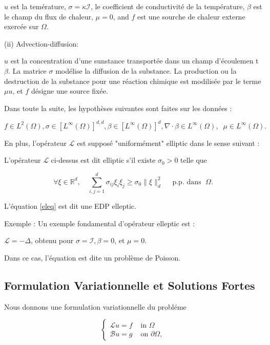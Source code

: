 $u$ est la temérature, $\sigma=\kappa \mathcal{I}$,  le coefficient de  conductivité de la température, $\beta$ est le champ du flux de chaleur, $\mu=0$, and $f$ est une sourche de chaleur externe exercée sur $\Omega$.



(ii) Advection-diffusion: 

$u$ est  la concentration d'une sunstance  transportée dans un champ d'écoulemen t$\beta$. La matrice $\sigma$ modélise la diffusion de la substance.  La production ou la  destruction de la substance pour une réaction chimique est modilisée par le terme  $\mu u$, et  $f$ désigne une source fixée.

Dans toute la suite,  les  hypothèses suivantes sont faites sur les données : 

$$f \in L^{2}(\Omega), \sigma \in\left[L^{\infty}(\Omega)\right]^{d, d}, \beta \in\left[L^{\infty}(\Omega)\right]^{d}, \nabla \cdot \beta \in L^{\infty}(\Omega), \;\;
\mu \in L^{\infty}(\Omega) .
$$ 


En plus, l'opérateur $\mathcal{L}$ est supposé "uniformément" elliptic dans le sense suivant : 

\begin{definition}
	
L'opérateur $\mathcal{L}$ ci-dessus est dit elliptic s'il existe $\sigma_{0}>0$ telle que 

\begin{equation}\label{elip}
\forall \xi \in \mathbb{R}^{d}, \quad \sum_{i, j=1}^{d} \sigma_{i j} \xi_{i} \xi_{j} \geq \sigma_{0}\|\xi\|_{d}^{2} \quad \text { p.p. dans  } \;  \Omega.
\end{equation}

L'équation \eqref{eleq} est dit une EDP elleptic.
\end{definition}


Exemple : Un exemple fondamental d'opérateur elleptic est :  

$\mathcal{L}=-\Delta$, obtenu pour $\sigma=\mathcal{I}, \beta=0$, et  $\mu=0$.


Dans ce cas, l'équation est dite  un problème de  Poisson.

\subsection{Formulation Variationnelle et Solutions Fortes}

Nous donnons une formulation variationnelle du probléme 

\begin{equation}\label{eleq1}
	\left\{\begin{array}{ll}
		\mathcal{L} u=f & \text { in } \Omega \\
		\mathcal{B} u=g & \text { on } \partial \Omega, 
	\end{array}\right.
\end{equation}

